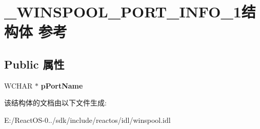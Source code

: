 \hypertarget{struct___w_i_n_s_p_o_o_l___p_o_r_t___i_n_f_o__1}{}\section{\+\_\+\+W\+I\+N\+S\+P\+O\+O\+L\+\_\+\+P\+O\+R\+T\+\_\+\+I\+N\+F\+O\+\_\+1结构体 参考}
\label{struct___w_i_n_s_p_o_o_l___p_o_r_t___i_n_f_o__1}
\subsection*{Public 属性}
\begin{DoxyCompactItemize}
\item 
\mbox{\label{struct___w_i_n_s_p_o_o_l___p_o_r_t___i_n_f_o__1_a25343d204a0afe7a522421a739edc8f7}} 
W\+C\+H\+AR $\ast$ {\bfseries p\+Port\+Name}
\end{DoxyCompactItemize}


该结构体的文档由以下文件生成\+:\begin{DoxyCompactItemize}
\item 
E\+:/\+React\+O\+S-\/0../sdk/include/reactos/idl/winspool.\+idl\end{DoxyCompactItemize}
